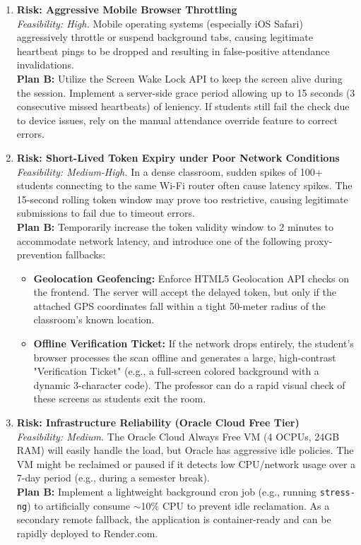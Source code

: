 \documentclass[11pt,a4paper]{article}
\begin{document}
\begin{enumerate}
    \item \textbf{Risk: Aggressive Mobile Browser Throttling}\\
    \textit{Feasibility: High.} Mobile operating systems (especially iOS Safari) aggressively throttle or suspend background tabs, causing legitimate heartbeat pings to be dropped and resulting in false-positive attendance invalidations.\\
    \textbf{Plan B:} Utilize the Screen Wake Lock API to keep the screen alive during the session. Implement a server-side grace period allowing up to 15 seconds (3 consecutive missed heartbeats) of leniency. If students still fail the check due to device issues, rely on the manual attendance override feature to correct errors.
    
    \item \textbf{Risk: Short-Lived Token Expiry under Poor Network Conditions}\\
    \textit{Feasibility: Medium-High.} In a dense classroom, sudden spikes of 100+ students connecting to the same Wi-Fi router often cause latency spikes. The 15-second rolling token window may prove too restrictive, causing legitimate submissions to fail due to timeout errors. \\
    \textbf{Plan B:} Temporarily increase the token validity window to 2 minutes to accommodate network latency, and introduce one of the following proxy-prevention fallbacks:
    \begin{itemize}
        \item \textbf{Geolocation Geofencing:} Enforce HTML5 Geolocation API checks on the frontend. The server will accept the delayed token, but only if the attached GPS coordinates fall within a tight 50-meter radius of the classroom's known location.
        \item \textbf{Offline Verification Ticket:} If the network drops entirely, the student's browser processes the scan offline and generates a large, high-contrast "Verification Ticket" (e.g., a full-screen colored background with a dynamic 3-character code). The professor can do a rapid visual check of these screens as students exit the room.
    \end{itemize}
    
    \item \textbf{Risk: Infrastructure Reliability (Oracle Cloud Free Tier)}\\
    \textit{Feasibility: Medium.} The Oracle Cloud Always Free VM (4 OCPUs, 24GB RAM) will easily handle the load, but Oracle has aggressive idle policies. The VM might be reclaimed or paused if it detects low CPU/network usage over a 7-day period (e.g., during a semester break). \\
    \textbf{Plan B:} Implement a lightweight background cron job (e.g., running \texttt{stress-ng}) to artificially consume $\sim$10\% CPU to prevent idle reclamation. As a secondary remote fallback, the application is container-ready and can be rapidly deployed to Render.com.
    

\end{enumerate}
\end{document}
